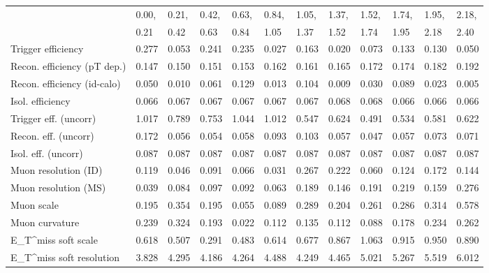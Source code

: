 \begin{tabular}{l|p{0.6cm}p{0.6cm}p{0.6cm}p{0.6cm}p{0.6cm}p{0.6cm}p{0.6cm}p{0.6cm}p{0.6cm}p{0.6cm}p{0.6cm}}
\hline
   & 0.00, & 0.21, & 0.42, & 0.63, & 0.84, & 1.05, & 1.37, & 1.52, & 1.74, & 1.95, & 2.18,  \\ 
   & 0.21 & 0.42 & 0.63 & 0.84 & 1.05 & 1.37 & 1.52 & 1.74 & 1.95 & 2.18 & 2.40  \\ 
\hline
Trigger efficiency                       & 0.277 & 0.053 & 0.241 & 0.235 & 0.027 & 0.163 & 0.020 & 0.073 & 0.133 & 0.130 & 0.050 \\
Recon. efficiency (pT dep.)              & 0.147 & 0.150 & 0.151 & 0.153 & 0.162 & 0.161 & 0.165 & 0.172 & 0.174 & 0.182 & 0.192 \\
Recon. efficiency (id-calo)              & 0.050 & 0.010 & 0.061 & 0.129 & 0.013 & 0.104 & 0.009 & 0.030 & 0.089 & 0.023 & 0.005 \\
Isol. efficiency                         & 0.066 & 0.067 & 0.067 & 0.067 & 0.067 & 0.067 & 0.068 & 0.068 & 0.066 & 0.066 & 0.066 \\
Trigger eff. (uncorr)                    & 1.017 & 0.789 & 0.753 & 1.044 & 1.012 & 0.547 & 0.624 & 0.491 & 0.534 & 0.581 & 0.622 \\
Recon. eff. (uncorr)                     & 0.172 & 0.056 & 0.054 & 0.058 & 0.093 & 0.103 & 0.057 & 0.047 & 0.057 & 0.073 & 0.071 \\
Isol. eff. (uncorr)                      & 0.087 & 0.087 & 0.087 & 0.087 & 0.087 & 0.087 & 0.087 & 0.087 & 0.087 & 0.087 & 0.087 \\
Muon resolution (ID)                     & 0.119 & 0.046 & 0.091 & 0.066 & 0.031 & 0.267 & 0.222 & 0.060 & 0.124 & 0.172 & 0.144 \\
Muon resolution (MS)                     & 0.039 & 0.084 & 0.097 & 0.092 & 0.063 & 0.189 & 0.146 & 0.191 & 0.219 & 0.159 & 0.276 \\
Muon scale                               & 0.195 & 0.354 & 0.195 & 0.055 & 0.089 & 0.289 & 0.204 & 0.261 & 0.286 & 0.314 & 0.578 \\
Muon curvature                           & 0.239 & 0.324 & 0.193 & 0.022 & 0.112 & 0.135 & 0.112 & 0.088 & 0.178 & 0.234 & 0.262 \\
E_{T}^{miss} soft scale                  & 0.618 & 0.507 & 0.291 & 0.483 & 0.614 & 0.677 & 0.867 & 1.063 & 0.915 & 0.950 & 0.890 \\
E_{T}^{miss} soft resolution             & 3.828 & 4.295 & 4.186 & 4.264 & 4.488 & 4.249 & 4.465 & 5.021 & 5.267 & 5.519 & 6.012 \\

\end{tabular}
